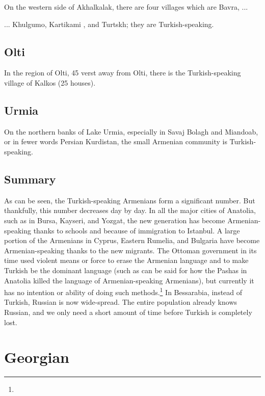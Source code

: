 On the western side of Akhalkalak, there are four villages which are Bavra, ... 



\begin{adjarianpage}\label{page:32}\end{adjarianpage}%

... Khulgumo, Kartikami , and Turtskh; they are Turkish-speaking.

\subsection{Olti}
In the region of Olti, 45 verst away from Olti, there is the Turkish-speaking village of Kalkos (25 houses).

\subsection{Urmia}
On the northern banks of Lake Urmia, especially in Savaj Bolagh and Miandoab, or in fewer words Persian Kurdistan, the small Armenian community is Turkish-speaking. 

\subsection{Summary}

As can be seen, the Turkish-speaking Armenians form a significant number. But thankfully, this number decreases day by day. In all the major cities of Anatolia, such as in Bursa, Kayseri, and Yozgat, the new generation has become Armenian-speaking thanks to schools and because of immigration to Istanbul. A large portion of the Armenians in Cyprus, Eastern Rumelia, and Bulgaria have become Armenian-speaking thanks to the new migrants. The Ottoman government in its time used violent means or force to erase the Armenian language and to make Turkish be the dominant language (such as can be said for how the Pashas in Anatolia killed the language of Armenian-speaking Armenians), but currently it has no intention or ability of doing such methods.\footnote{} In Bessarabia, instead of Turkish, Russian is now wide-spread. The entire population already knows Russian, and we only need a short amount of time before Turkish is completely lost. 

\section{Georgian}

